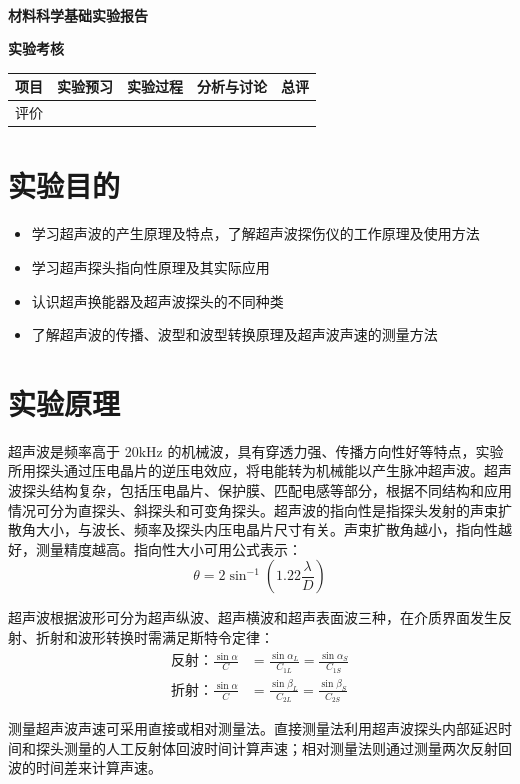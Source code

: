 \documentclass[a4paper,utf8]{article}
\begin{document}
\begin{center}
    {\mbox{}\\[7em]\bfseries\songti%
    材料科学基础实验报告}\\[34mm]
    {\bfseries\songti
    实验考核\\[3mm]
    \extrarowheight=3mm
    \begin{tabularx}{150mm}{|X|X|X|X|X|}\hline
        \hfil 项目 \hfil  & \hfil 实验预习 \hfil & \hfil 实验过程 \hfil & \hfil 分析与讨论 \hfil & \hfil 总评 \hfil \\[3mm] \hline
        \hfil 评价 \hfil &  &  &  &  \\[3mm] \hline
    \end{tabularx}
    }
\end{center}\newpage
\section{实验目的}
    \begin{itemize}
        \item 学习超声波的产生原理及特点，了解超声波探伤仪的工作原理及使用方法 
        \item 学习超声探头指向性原理及其实际应用
        \item 认识超声换能器及超声波探头的不同种类
        \item 了解超声波的传播、波型和波型转换原理及超声波声速的测量方法
    \end{itemize}
\section{实验原理}%
    超声波是频率高于 20kHz 的机械波，具有穿透力强、传播方向性好等特点，实验所用探头通过压电晶片的逆压电效应，将电能转为机械能以产生脉冲超声波。超声波探头结构复杂，包括压电晶片、保护膜、匹配电感等部分，根据不同结构和应用情况可分为直探头、斜探头和可变角探头。超声波的指向性是指探头发射的声束扩散角大小，与波长、频率及探头内压电晶片尺寸有关。声束扩散角越小，指向性越好，测量精度越高。指向性大小可用公式表示：
    \begin{equation}
        \theta=2\sin^{-1}\left(1.22\frac\lambda D\right)
    \end{equation}\par
    超声波根据波形可分为超声纵波、超声横波和超声表面波三种，在介质界面发生反射、折射和波形转换时需满足斯特令定律：
    \begin{equation}
        \begin{aligned}
            \text{反射：}\frac{\sin\alpha}C&=\frac{\sin\alpha_L}{C_{1L}}=\frac{\sin\alpha_S}{C_{1S}}\\
            \text{折射：}\frac{\sin\alpha}C&=\frac{\sin\beta_L}{C_{2L}}=\frac{\sin\beta_S}{C_{2S}}
        \end{aligned}
    \end{equation}\par
    测量超声波声速可采用直接或相对测量法。直接测量法利用超声波探头内部延迟时间和探头测量的人工反射体回波时间计算声速；相对测量法则通过测量两次反射回波的时间差来计算声速。
\end{document}
